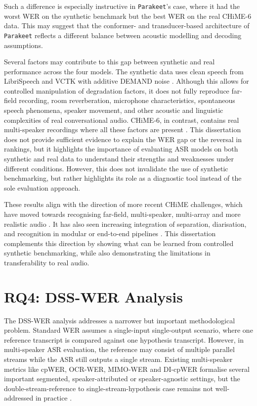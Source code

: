 Such a difference is especially instructive in \texttt{Parakeet}'s case, where it had the worst WER on the synthetic benchmark but the best WER on the real CHiME-6 data. This may suggest that the conformer- and transducer-based architecture of \texttt{Parakeet} reflects a different balance between acoustic modelling and decoding assumptions. 

Several factors may contribute to this gap between synthetic and real performance across the four models. The synthetic data uses clean speech from LibriSpeech and VCTK with additive DEMAND noise \citep{librispeech, voxceleb, demand}. Although this allows for controlled manipulation of degradation factors, it does not fully reproduce far-field recording, room reverberation, microphone characteristics, spontaneous speech phenomena, speaker movement, and other acoustic and linguistic complexities of real conversational audio. CHiME-6, in contrast, contains real multi-speaker recordings where all these factors are present \cite{watanabe2020chime6challengetacklingmultispeakerspeech}. This dissertation does not provide sufficient evidence to explain the WER gap or the reversal in rankings, but it highlights the importance of evaluating ASR models on both synthetic and real data to understand their strengths and weaknesses under different conditions. However, this does not invalidate the use of synthetic benchmarking, but rather highlights its role as a diagnostic tool instead of the sole evaluation approach.

These results align with the direction of more recent CHiME challenges, which have moved towards recognising far-field, multi-speaker, multi-array and more realistic audio \citep{BARKER2017605, chime7, chime8_task1, cornell2024chime8dasrchallengegeneralizable}. It has also seen increasing integration of separation, diarisation, and recognition in modular or end-to-end pipelines \citep{raj2020integrationspeechseparationdiarization, chen2020continuousspeechseparationconformer, vonneumann2024meetingrecognitioncontinuousspeech}. This dissertation complements this direction by showing what can be learned from controlled synthetic benchmarking, while also demonstrating the limitations in transferability to real audio.

\section{RQ4: DSS-WER Analysis}
The DSS-WER analysis addresses a narrower but important methodological problem. Standard WER assumes a single-input single-output scenario, where one reference transcript is compared against one hypothesis transcript. However, in multi-speaker ASR evaluation, the reference may consist of multiple parallel streams while the ASR still outputs a single stream. Existing multi-speaker metrics like cpWER, OCR-WER, MIMO-WER and DI-cpWER formalise several important segmented, speaker-attributed or speaker-agnostic settings, but the double-stream-reference to single-stream-hypothesis case remains not well-addressed in practice \citep{galibert2013methodologies, von_Neumann_2023, vonneumann2024meetevaltoolkitcomputationword, von_Neumann_2025, Word_Error_Rate_Definitions}. 

